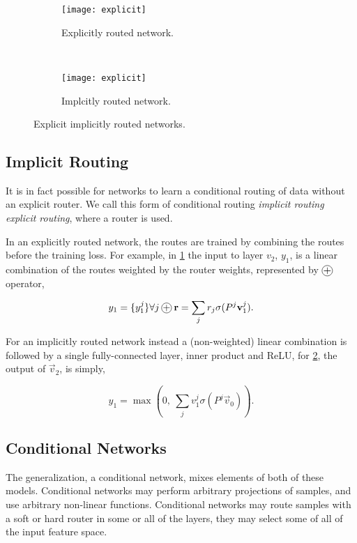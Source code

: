 \documentclass[thesis]{subfiles}
\begin{document}
	
	\begin{figure}[tbp] 
		\centering
		\begin{subfigure}[b]{0.45\textwidth}
			\centering
			\texttt{[image: explicit]}
			\caption{Explicitly routed network.}
			\label{fig:explicitRouter}
		\end{subfigure}
		~
		\begin{subfigure}[b]{0.45\textwidth}
			\centering
			\texttt{[image: explicit]}
			\caption{Implcitly routed network.}
			\label{fig:implicitRouter}
		\end{subfigure}
		\caption{Explicit \vs implicitly routed networks.}
		\label{fig:routerConnections}
	\end{figure}
	
	\subsection{Implicit Routing}
	It is in fact possible for networks to learn a conditional routing of data without an explicit router. We call this form of conditional routing \emph{implicit routing} \vs \emph{explicit routing}, where a router is used. 
	
	In an explicitly routed network, the routes are trained by combining the routes before the training loss. For example, in \cref{fig:explicitRouter} the input to layer $v_2$, $y_1$, is a linear combination of the routes weighted by the router weights, represented by $\circleplus$ operator,
	
	\begin{equation}
	y_1 = \{y_1^j\} \forall j\circleplus \vec r = \sum_j r_j \sigma(P^j \vec v_1^j ).
	\end{equation}
	
	For an implicitly routed network instead a (non-weighted) linear combination is followed by a single fully-connected layer, \ie inner product and ReLU, \ie for \cref{fig:implicitRouter}, the output of $\vec v_2$,  is simply,
	
	\begin{equation}
	y_1 = \max (0, ~\sum_j v_1^j \sigma(P^j \vec v_0) ).
	\end{equation}
	
	\subsection{Conditional Networks}
	The generalization, a conditional network, mixes elements of both of these models. Conditional networks may perform arbitrary projections of samples, and use arbitrary non-linear functions. Conditional networks may route samples with a soft or hard router in some or all of the layers, they may select some of all of the input feature space. 
	
\end{document}
